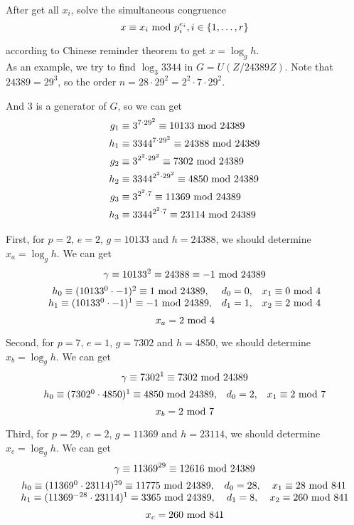 \documentclass{article}
\renewcommand{\mod}{{\rm\ mod\ }}
\begin{document}
After get all $x_i$, solve the simultaneous congruence $$x\equiv x_i \mod p_i^{e_i},i\in\{1,\dots,r\}$$

according to Chinese reminder theorem to get $x=\log_gh$.\\

As an example, we try to find $\log_3 3344$ in $G=U(Z/24389Z).$ Note that $24389=29^3$, so the order $n=28\cdot29^2=2^2\cdot7\cdot29^2$.

And 3 is a generator of $G$, so we can get 
\begin{align*}
g_1 &\equiv 3^{7\cdot29^2}\equiv 10133 \mod 24389\\
h_1 &\equiv 3344^{7\cdot29^2}\equiv 24388 \mod 24389\\
g_2 &\equiv 3^{2^2\cdot29^2}\equiv 7302 \mod 24389\\
h_2 &\equiv 3344^{2^2\cdot29^2}\equiv 4850 \mod 24389 \\
g_3 &\equiv 3^{2^2\cdot7}\equiv 11369 \mod 24389\\
h_3 &\equiv 3344^{2^2\cdot7}\equiv 23114 \mod 24389
\end{align*}

First, for $p=2$, $e=2$, $g=10133$ and $h=24388$, we should determine $x_a=\log_gh$. We can get
$$\gamma\equiv 10133^{2} \equiv 24388 \equiv -1 \mod 24389$$
$$
\begin{array}{ccc}
h_0 \equiv (10133^{0}\cdot -1)^{2} \equiv 1 \mod 24389, & d_0=0, & x_1\equiv 0 \mod 4 \\
h_1 \equiv (10133^{0}\cdot -1)^{1} \equiv -1 \mod 24389, & d_1=1, & x_2\equiv 2 \mod 4 \\
\end{array}
$$
$$x_a=2 \mod 4$$

Second, for $p=7$, $e=1$, $g=7302$ and $h=4850$, we should determine $x_b=\log_gh$. We can get
$$\gamma\equiv 7302^{1} \equiv 7302 \mod 24389$$
$$
\begin{array}{ccc}
h_0 \equiv (7302^{0}\cdot 4850)^{1} \equiv 4850 \mod 24389, & d_0=2, & x_1\equiv 2 \mod 7 \\
\end{array}
$$
$$x_b=2 \mod 7$$

Third, for $p=29$, $e=2$, $g=11369$ and $h=23114$, we should determine $x_c=\log_gh$. We can get
$$\gamma\equiv 11369^{29} \equiv 12616 \mod 24389$$
$$
\begin{array}{ccc}
h_0 \equiv (11369^{0}\cdot 23114)^{29} \equiv 11775 \mod 24389, & d_0=28, & x_1\equiv 28 \mod 841 \\
h_1 \equiv (11369^{-28}\cdot 23114)^{1} \equiv 3365 \mod 24389, & d_1=8, & x_2\equiv 260 \mod 841 \\
\end{array}
$$
$$x_c=260 \mod 841$$
\end{document}

